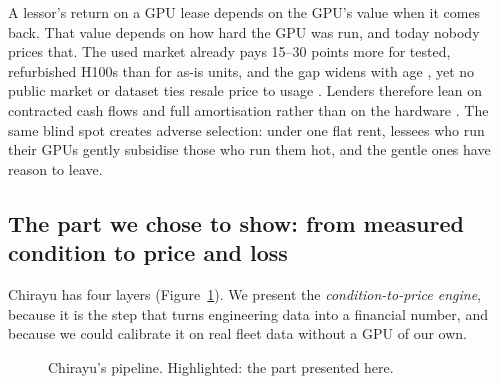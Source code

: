 \documentclass[10pt]{article}
\begin{document}
A lessor's return on a GPU lease depends on the GPU's value when it comes back. That value depends on how hard the GPU was run, and today nobody prices that. The used market already pays 15--30 points more for tested, refurbished H100s than for as-is units, and the gap widens with age \cite{silicondata}, yet no public market or dataset ties resale price to usage \cite{silicondata,wing}. Lenders therefore lean on contracted cash flows and full amortisation rather than on the hardware \cite{wing}. The same blind spot creates adverse selection: under one flat rent, lessees who run their GPUs gently subsidise those who run them hot, and the gentle ones have reason to leave.

\subsection{The part we chose to show: from measured condition to price and loss}
Chirayu has four layers (Figure~\ref{fig:arch}). We present the \emph{condition-to-price engine}, because it is the step that turns engineering data into a financial number, and because we could calibrate it on real fleet data without a GPU of our own.

\begin{figure}[h]
\centering
{}
\caption{Chirayu's pipeline. Highlighted: the part presented here.}
\label{fig:arch}
\end{figure}
\end{document}
